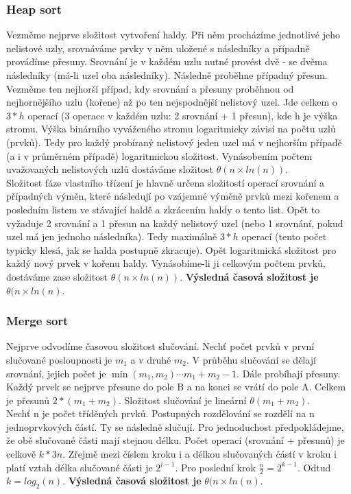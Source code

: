 \documentclass[10pt,a4paper]{article}
\begin{document}
\subsubsection{Heap sort}
Vezměme nejprve složitost vytvoření haldy. Při něm procházíme jednotlivé jeho nelistové uzly, srovnáváme prvky v něm uložené s následníky a případně provádíme přesuny. Srovnání je v každém uzlu nutné provést dvě - se dvěma následníky (má-li uzel oba následníky). Následně proběhne případný přesun. Vezměme ten nejhorší případ, kdy srovnání a přesuny proběhnou od nejhornějšího uzlu (kořene) až po ten nejspodnější nelistový uzel. Jde celkem o $3 \ast h$ operací (3 operace v každém uzlu: 2 srovnání + 1 přesun), kde h je výška stromu. Výška binárního vyváženého stromu logaritmicky závisí na počtu uzlů (prvků). Tedy pro každý probíraný nelistový jeden uzel má v nejhorším případě (a i v průměrném případě) logaritmickou složitost. Vynásobením počtem uvažovaných nelistových uzlů dostáváme složitost $\theta(n\times ln(n))$. \\
Složitost fáze vlastního třízení je hlavně určena složitostí operací srovnání a případných výměn, které následují po vzájemné výměně prvků mezi kořenem a posledním listem ve stávající haldě a zkrácením haldy o tento list. Opět to vyžaduje 2 srovnání a 1 přesun na každý nelistový uzel (nebo 1 srovnání, pokud uzel má jen jednoho následníka). Tedy maximálně $3\ast h$ operací (tento počet typicky klesá, jak se halda postupně zkracuje). Opět logaritmická složitost pro každý nový prvek v kořenu haldy. Vynásobíme-li ji celkovým počtem prvků, dostáváme zase složitost $\theta(n\times ln(n))$. \textbf{Výsledná časová složitost je} $\theta (n \times ln(n)$.

\subsubsection{Merge sort}
Nejprve odvodíme časovou složitost slučování. Nechť počet prvků v první slučované posloupnosti je $m_1$ a v druhé $m_2$. V průběhu slučování se dělají srovnání, jejich počet je $\min (m_1, m_2) \cdots m_1 + m_2 - 1$. Dále probíhají přesuny. Každý prvek se nejprve přesune do pole B a na konci se vrátí do pole A. Celkem je přesunů $2 \ast (m_1 + m_2)$. Složitost slučování je lineární $\theta (m_1 + m_2)$. \\
Nechť n je počet tříděných prvků. Postupných rozdělování se rozdělí na n jednoprvkových částí. Ty se následně slučují. Pro jednoduchost předpokládejme, že obě slučované části mají stejnou délku. Počet operací (srovnání + přesunů) je celkově $k\ast 3n$. Zřejmě mezi číslem kroku i a délkou slučovaných částí v kroku i platí vztah délka slučované části je $2^{i-1}$. Pro poslední krok $\frac{n}{2} = 2^{k-1}$. Odtud $k = log_2(n)$. \textbf{Výsledná časová složitost je} $\theta (n \times ln(n)$.
\end{document}
